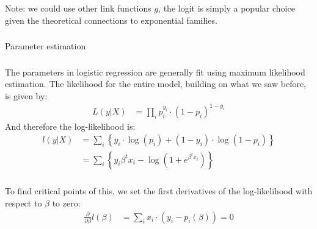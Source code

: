 \begin{frame}[fragile] \frametitle{}

Note: we could use other link functions $g$, the logit is simply
a popular choice given the theoretical connections to exponential
families.

\end{frame}

\begin{frame}[fragile] \frametitle{}

\begin{flushright}
{\color{yaleblue}\sc\fontsize{1cm}{0cm}\selectfont Parameter estimation}
\end{flushright}

\end{frame}

\begin{frame}[fragile] \frametitle{}

The parameters in logistic regression are generally fit using maximum
likelihood estimation. The likelihood for the entire model, building
on what we saw before, is given by:
\begin{align*}
L(y | X) &= \prod_i p_i^{y_i} \cdot (1 - p_i)^{1 - y_i}
\end{align*}
\pause And therefore the log-likelihood is:
\begin{align*}
l(y | X) &= \sum_i \left\{ y_i \cdot \log(p_i) + (1 - y_i) \cdot \log(1 - p_i) \right\} \\
&= \sum_i \left\{ y_i \beta^t x_i - \log\left( 1 + e^{\beta^t x_i} \right) \right\}
\end{align*}

\end{frame}

\begin{frame}[fragile] \frametitle{}

To find critical points of this,
we set the first derivatives of the log-likelihood with respect to $\beta$
to zero:
\begin{align*}
\frac{\partial}{\partial \beta} l(\beta) &= \sum_i x_i \cdot (y_i - p_i(\beta)) = 0
\end{align*}


\end{frame}















